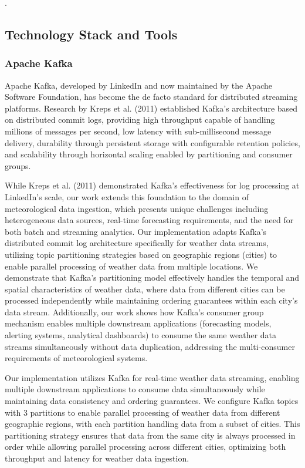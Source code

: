 \documentclass[12pt,a4paper]{article}
\begin{document}
.

\subsection{Technology Stack and Tools}

\subsubsection{Apache Kafka}

Apache Kafka, developed by LinkedIn and now maintained by the Apache Software Foundation, has become the de facto standard for distributed streaming platforms. Research by Kreps et al. (2011) established Kafka's architecture based on distributed commit logs, providing high throughput capable of handling millions of messages per second, low latency with sub-millisecond message delivery, durability through persistent storage with configurable retention policies, and scalability through horizontal scaling enabled by partitioning and consumer groups.

While Kreps et al. (2011) demonstrated Kafka's effectiveness for log processing at LinkedIn's scale, our work extends this foundation to the domain of meteorological data ingestion, which presents unique challenges including heterogeneous data sources, real-time forecasting requirements, and the need for both batch and streaming analytics. Our implementation adapts Kafka's distributed commit log architecture specifically for weather data streams, utilizing topic partitioning strategies based on geographic regions (cities) to enable parallel processing of weather data from multiple locations. We demonstrate that Kafka's partitioning model effectively handles the temporal and spatial characteristics of weather data, where data from different cities can be processed independently while maintaining ordering guarantees within each city's data stream. Additionally, our work shows how Kafka's consumer group mechanism enables multiple downstream applications (forecasting models, alerting systems, analytical dashboards) to consume the same weather data streams simultaneously without data duplication, addressing the multi-consumer requirements of meteorological systems.

Our implementation utilizes Kafka for real-time weather data streaming, enabling multiple downstream applications to consume data simultaneously while maintaining data consistency and ordering guarantees. We configure Kafka topics with 3 partitions to enable parallel processing of weather data from different geographic regions, with each partition handling data from a subset of cities. This partitioning strategy ensures that data from the same city is always processed in order while allowing parallel processing across different cities, optimizing both throughput and latency for weather data ingestion.
\end{document}
